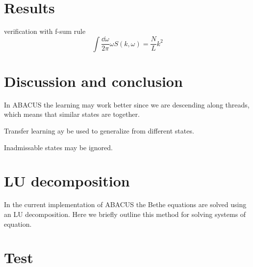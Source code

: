 \documentclass[11pt, a4paper,draft]{report} %
\begin{document}
\chapter{Results}

verification with f-sum rule \cite{Caux2007a}
\begin{equation}
    \int \frac{\dd \omega}{2\pi} \omega S(k, \omega) = \frac{N}{L} k^2
\end{equation}

\chapter{Discussion and conclusion}


In ABACUS the learning may work better since we are descending along threads, which means that similar states are together.

Transfer learning ay be used to generalize from different states.

Inadmissable states may be ignored.

\appendix
\chapter{LU decomposition}\label{app:LUdecomp}
In the current implementation of ABACUS the Bethe equations are solved using an LU decomposition. 
Here we briefly outline this method for solving systems of equation.

\chapter{Test}	



\end{document}
